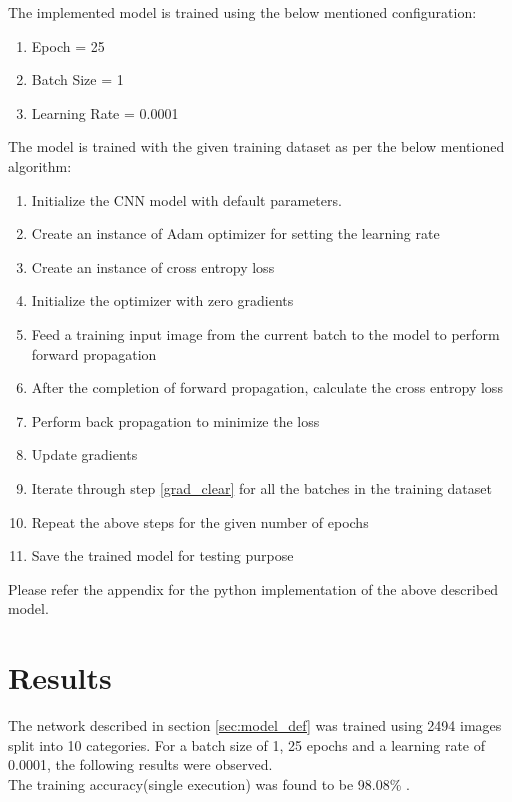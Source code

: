 \documentclass[12pt]{article}
\begin{document}
The implemented model is trained using the below mentioned configuration:
\begin{enumerate}
	\item Epoch = 25	
	\item Batch Size = 1
	\item Learning Rate = 0.0001
\end{enumerate}

The model is trained with the given training dataset as per the below mentioned algorithm:
\begin{enumerate}
	\item Initialize the CNN model with default parameters. 
	\item Create an instance of Adam optimizer for setting the learning rate
	\item Create an instance of cross entropy loss
	\item Initialize the optimizer with zero gradients \label{grad_clear}
	\item Feed a training input image from the current batch to the model to perform forward propagation
	\item After the completion of forward propagation, calculate the cross entropy loss
	\item Perform back propagation to minimize the loss
	\item Update gradients
	\item Iterate through step \ref{grad_clear} for all the batches in the training dataset
	\item Repeat the above steps for the given number of epochs
	\item Save the trained model for testing purpose
	
\end{enumerate}


Please refer the appendix for the python implementation of the above described model. 
\newpage

\section{Results}
The network described in section \ref{sec:model_def} was trained using 2494 images split into 10 categories. For a batch size of 1, 25 epochs and a learning rate of 0.0001, the following results were observed. \\

\noindent
The training accuracy(single execution) was found to be 98.08\% . \\
\end{document}
